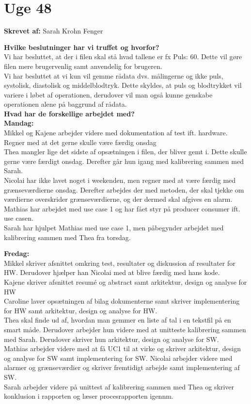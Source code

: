 \section{Uge 48}

\textbf{Skrevet af:} Sarah Krohn Fenger

\textbf{Hvilke beslutninger har vi truffet og hvorfor?} \\
Vi har besluttet, at der i filen skal stå hvad tallene er fx Puls: 60. Dette vil gøre filen mere brugervenlig samt anvendelig for brugeren. \\
Vi har besluttet at vi kun vil gemme rådata dvs. målingerne og ikke puls, systolisk, diastolisk og middelblodtryk. Dette skyldes, at puls og blodtrykket vil variere i løbet af operationen, derudover vil man også kunne genskabe operationen alene på baggrund af rådata. \\

\textbf{Hvad har de forskellige arbejdet med?} \\
\textbf{Mandag:} \\
Mikkel og Kajene arbejder videre med dokumentation af test ift. hardware. Regner med at det gerne skulle være færdig onsdag \\
Thea mangler lige det sidste af opsætningen i filen, der bliver gemt i. Dette skulle gerne være færdigt onsdag. Derefter går hun igang med kalibrering sammen med Sarah. \\ 
Nicolai har ikke lavet noget i weekenden, men regner med at være færdig med grænseværdierne onsdag. Derefter arbejdes der med metoden, der skal tjekke om værdierne overskrider grænseværdierne, og der dermed skal afgives en alarm. \\ 
Mathias har arbejdet med use case 1 og har fået styr på producer consumer ift. use casen. \\
Sarah har hjulpet Mathias med use case 1, men påbegynder arbejdet med kalibrering sammen med Thea fra torsdag. 

\textbf{Fredag:} \\
Mikkel skriver afsnittet omkring test, resultater og diskussion af resultater for HW. Derudover hjælper han Nicolai med at blive færdig med hans kode. \\
Kajene skriver afsnittet resumé og abstract samt arkitektur, design og analyse for HW \\
Caroline laver opsætningen af bilag dokumenterne samt skriver implementering for HW samt arkitektur, design og analyse for HW. \\
Thea skal finde ud af, hvordan man gemmer en liste af tal i en tekstfil på en smart måde. Derudover arbejder hun videre med at unitteste kalibrering sammen med Sarah. Derudover skriver hun arkitektur, design og analyse for SW. \\
Mathias arbejder videre med at få UC1 til at virke og skriver arkitektur, design og analyse for SW samt implementering for SW. 
Nicolai arbejder videre med alarmer og grænseværdier og skriver fremtidigt arbejde samt implementering af SW. \\
Sarah arbejder videre på unittest af kalibrering sammen med Thea og skriver konklusion i rapporten og læser procesrapporten igennm. 


